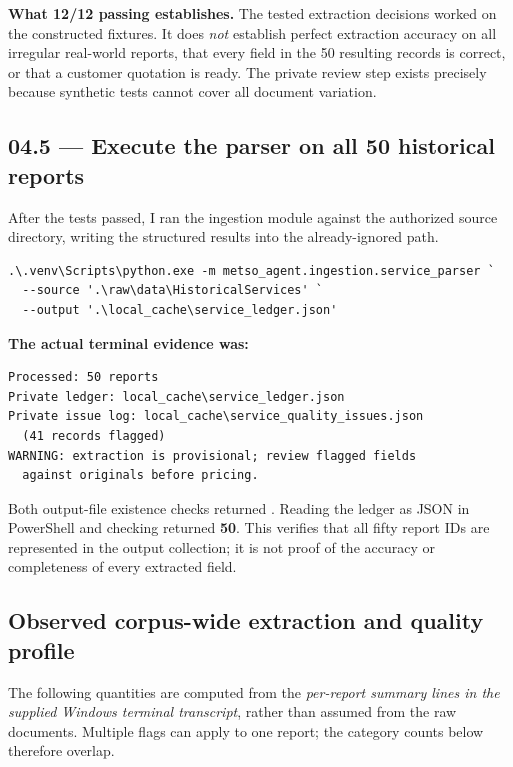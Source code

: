 \documentclass[11pt,a4paper]{article}
\DeclareRobustCommand{\code}[1]{{\ttfamily\small\detokenize{#1}}}
\begin{document}
\begin{keybox}
\textbf{What 12/12 passing establishes.} The tested extraction decisions worked on the constructed fixtures. It does \emph{not} establish perfect extraction accuracy on all irregular real-world reports, that every field in the 50 resulting records is correct, or that a customer quotation is ready. The private review step exists precisely because synthetic tests cannot cover all document variation.
\end{keybox}

\subsection{04.5 --- Execute the parser on all 50 historical reports}
After the tests passed, I ran the ingestion module against the authorized source directory, writing the structured results into the already-ignored \code{local_cache/} path.

\begin{Verbatim}[fontsize=\footnotesize]
.\.venv\Scripts\python.exe -m metso_agent.ingestion.service_parser `
  --source '.\raw\data\HistoricalServices' `
  --output '.\local_cache\service_ledger.json'
\end{Verbatim}

\textbf{The actual terminal evidence was:}
\begin{Verbatim}[fontsize=\footnotesize]
Processed: 50 reports
Private ledger: local_cache\service_ledger.json
Private issue log: local_cache\service_quality_issues.json
  (41 records flagged)
WARNING: extraction is provisional; review flagged fields
  against originals before pricing.
\end{Verbatim}

Both output-file existence checks returned \code{True}. Reading the ledger as JSON in PowerShell and checking \code{Count} returned \textbf{50}. This verifies that all fifty report IDs are represented in the output collection; it is not proof of the accuracy or completeness of every extracted field.

\subsection{Observed corpus-wide extraction and quality profile}
The following quantities are computed from the \emph{per-report summary lines in the supplied Windows terminal transcript}, rather than assumed from the raw documents. Multiple flags can apply to one report; the category counts below therefore overlap.
\end{document}

